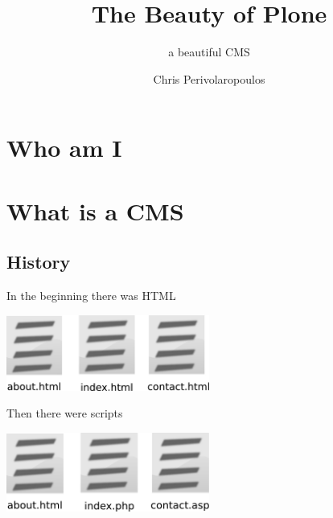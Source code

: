 \documentclass[arial,pdftex]{beamer}
\title{The Beauty of Plone}
\subtitle{a beautiful CMS}
\author{Chris Perivolaropoulos}
\begin{document}
\section{Who am I}
\frame{\titlepage}

\section{What is a CMS}

\subsection{History}
\begin{frame}{In the beginning there was HTML}
  \begin{center}
    \includegraphics[width=0.5\textwidth]{html.pdf}
  \end{center}
\end{frame}


%

\begin{frame}{Then there were scripts}
  \begin{center}
    \includegraphics[width=0.5\textwidth]{scripts.pdf}
  \end{center}
\end{frame}

%


\end{document}
